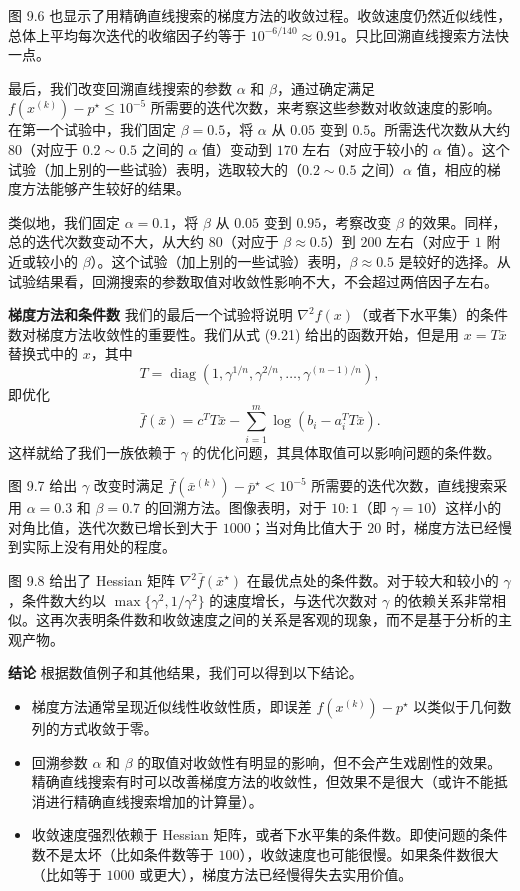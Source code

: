 \documentclass[UTF8, 12pt, fontset=fandol, oneside]{ctexart}
\begin{document}
图 9.6 也显示了用精确直线搜索的梯度方法的收敛过程。收敛速度仍然近似线性，总体上平均每次迭代的收缩因子约等于 $10^{-6/140}\approx0.91$。只比回溯直线搜索方法快一点。

最后，我们改变回溯直线搜索的参数 $\alpha$ 和 $\beta$，通过确定满足 $f(x^{(k)})-p^\star\leq10^{-5}$ 所需要的迭代次数，来考察这些参数对收敛速度的影响。在第一个试验中，我们固定 $\beta=0.5$，将 $\alpha$ 从 $0.05$ 变到 $0.5$。所需迭代次数从大约 $80$（对应于 $0.2\sim0.5$ 之间的 $\alpha$ 值）变动到 $170$ 左右（对应于较小的 $\alpha$ 值）。这个试验（加上别的一些试验）表明，选取较大的（$0.2\sim0.5$ 之间）$\alpha$ 值，相应的梯度方法能够产生较好的结果。

类似地，我们固定 $\alpha=0.1$，将 $\beta$ 从 $0.05$ 变到 $0.95$，考察改变 $\beta$ 的效果。同样，总的迭代次数变动不大，从大约 $80$（对应于 $\beta\approx0.5$）到 $200$ 左右（对应于 $1$ 附近或较小的 $\beta$）。这个试验（加上别的一些试验）表明，$\beta\approx0.5$ 是较好的选择。从试验结果看，回溯搜索的参数取值对收敛性影响不大，不会超过两倍因子左右。

\noindent\textbf{梯度方法和条件数}\quad
我们的最后一个试验将说明 $\nabla^2 f(x)$（或者下水平集）的条件数对梯度方法收敛性的重要性。我们从式 (9.21) 给出的函数开始，但是用 $x=T\bar{x}$ 替换式中的 $x$，其中
\[
T=\operatorname{diag}(1,\gamma^{1/n},\gamma^{2/n},\ldots,\gamma^{(n-1)/n}),
\]
即优化
\begin{equation}
\bar{f}(\bar{x})=c^TT\bar{x}-\sum_{i=1}^m\log(b_i-a_i^TT\bar{x}).
\tag{9.22}
\end{equation}
这样就给了我们一族依赖于 $\gamma$ 的优化问题，其具体取值可以影响问题的条件数。

图 9.7 给出 $\gamma$ 改变时满足 $\bar{f}(\bar{x}^{(k)})-\bar{p}^\star<10^{-5}$ 所需要的迭代次数，直线搜索采用 $\alpha=0.3$ 和 $\beta=0.7$ 的回溯方法。图像表明，对于 $10:1$（即 $\gamma=10$）这样小的对角比值，迭代次数已增长到大于 $1000$；当对角比值大于 $20$ 时，梯度方法已经慢到实际上没有用处的程度。

图 9.8 给出了 Hessian 矩阵 $\nabla^2\bar{f}(\bar{x}^\star)$ 在最优点处的条件数。对于较大和较小的 $\gamma$，条件数大约以 $\max\{\gamma^2,1/\gamma^2\}$ 的速度增长，与迭代次数对 $\gamma$ 的依赖关系非常相似。这再次表明条件数和收敛速度之间的关系是客观的现象，而不是基于分析的主观产物。

\noindent\textbf{结论}\quad
根据数值例子和其他结果，我们可以得到以下结论。
\begin{itemize}
\item 梯度方法通常呈现近似线性收敛性质，即误差 $f(x^{(k)})-p^\star$ 以类似于几何数列的方式收敛于零。
\item 回溯参数 $\alpha$ 和 $\beta$ 的取值对收敛性有明显的影响，但不会产生戏剧性的效果。精确直线搜索有时可以改善梯度方法的收敛性，但效果不是很大（或许不能抵消进行精确直线搜索增加的计算量）。
\item 收敛速度强烈依赖于 Hessian 矩阵，或者下水平集的条件数。即使问题的条件数不是太坏（比如条件数等于 $100$），收敛速度也可能很慢。如果条件数很大（比如等于 $1000$ 或更大），梯度方法已经慢得失去实用价值。
\end{itemize}
\end{document}
